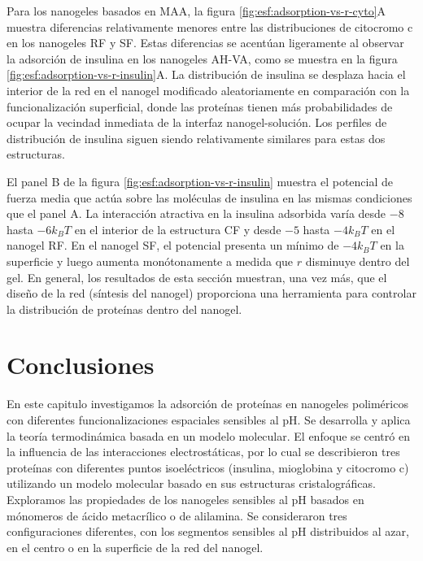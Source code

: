 Para los nanogeles basados en MAA, la figura \ref{fig:esf:adsorption-vs-r-cyto}A muestra diferencias relativamente menores entre las distribuciones de citocromo c en los nanogeles RF y SF.
Estas diferencias se acent\'uan ligeramente al observar la adsorci\'on de insulina en los nanogeles AH-VA, como se muestra en la figura \ref{fig:esf:adsorption-vs-r-insulin}A.
La distribuci\'on de insulina se desplaza hacia el interior de la red en el nanogel modificado aleatoriamente en comparaci\'on con la funcionalizaci\'on superficial, donde las prote\'inas tienen m\'as probabilidades de ocupar la vecindad inmediata de la interfaz nanogel-soluci\'on.
Los perfiles de distribuci\'on de insulina siguen siendo relativamente similares para estas dos estructuras.

El panel B de la figura \ref{fig:esf:adsorption-vs-r-insulin} muestra el potencial de fuerza media que act\'ua sobre las mol\'eculas de insulina en las mismas condiciones que el panel A.
La interacci\'on atractiva en la insulina adsorbida var\'ia desde $-8$ hasta $-6 k_B T$ en el interior de la estructura CF y desde $-5$ hasta $-4 k_B T$ en el nanogel RF.
En el nanogel SF, el potencial presenta un m\'inimo de $-4 k_B T$ en la superficie y luego aumenta mon\'otonamente a medida que $r$ disminuye dentro del gel.
En general, los resultados de esta secci\'on muestran, una vez m\'as, que el dise\~no de la red (s\'intesis del nanogel) proporciona una herramienta para controlar la distribuci\'on de prote\'inas dentro del nanogel.






\section{Conclusiones}


En este capitulo investigamos la adsorci\'on de prote\'inas en nanogeles polim\'ericos con diferentes funcionalizaciones espaciales sensibles al pH. Se desarrolla y aplica la teor\'ia termodin\'amica basada en un modelo molecular.
El enfoque se centr\'o en la influencia de las interacciones electrost\'aticas, por lo cual se describieron tres prote\'inas con diferentes puntos isoel\'ectricos (insulina, mioglobina y citocromo c) utilizando un modelo molecular basado en sus estructuras cristalogr\'aficas.
Exploramos las propiedades de los nanogeles sensibles al pH basados en m\'onomeros de  \'acido metacr\'ilico o de alilamina.
Se consideraron tres configuraciones diferentes, con los segmentos sensibles al pH distribuidos al azar, en el centro o en la superficie de la red del nanogel.

